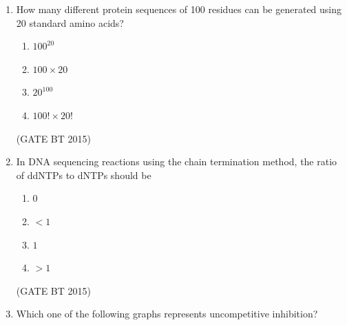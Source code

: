 \documentclass[journal,12pt,onecolumn]{IEEEtran}
\begin{document}
\begin{enumerate}[label=\textbf{Q.\arabic*}]
    \item How many different protein sequences of 100 residues can be generated using 20 standard amino acids?

    \begin{multicols}{4}
        \begin{enumerate}
            \item $100^{20}$
            \item $100 \times 20$
            \item $20^{100}$
            \item $100! \times 20!$
        \end{enumerate}
    \end{multicols}             \hfill (GATE BT 2015)


    \item In DNA sequencing reactions using the chain termination method, the ratio of ddNTPs to dNTPs should be

    \begin{multicols}{2}
        \begin{enumerate}
            \item $0$
            \item $< 1$
            \item $1$
            \item $> 1$
        \end{enumerate}
    \end{multicols}             \hfill (GATE BT 2015)

    \item Which one of the following graphs represents uncompetitive inhibition?


\end{enumerate}
\end{document}
